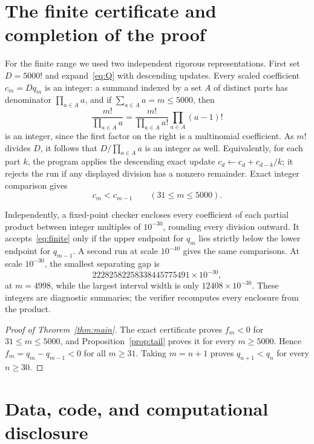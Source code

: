 \documentclass[11pt]{amsart}
\theoremstyle{remark}
\begin{document}
\section{The finite certificate and completion of the proof}

For the finite range we used two independent rigorous representations.
First set \(D=5000!\) and expand~\eqref{eq:Q} with descending updates. Every
scaled coefficient \(c_m=Dq_m\) is an integer: a summand indexed by a set
\(A\) of distinct parts has denominator \(\prod_{a\in A}a\), and
if \(\sum_{a\in A}a=m\le5000\), then
\[
 \frac{m!}{\prod_{a\in A}a}
 =\frac{m!}{\prod_{a\in A}a!}\prod_{a\in A}(a-1)!
\]
is an integer, since the first factor on the right is a multinomial
coefficient.  As \(m!\) divides \(D\), it follows that
\(D/\prod_{a\in A}a\) is an integer as well.  Equivalently, for each part
\(k\), the program applies the descending exact update
\(c_d\leftarrow c_d+c_{d-k}/k\); it rejects the run if any displayed division
has a nonzero remainder. Exact integer comparison gives
\begin{equation}\label{eq:finite}
 c_m<c_{m-1}\qquad(31\le m\le5000).
\end{equation}

Independently, a fixed-point checker encloses every coefficient of each
partial product between integer multiples of \(10^{-30}\), rounding every
division outward. It accepts~\eqref{eq:finite} only if the upper endpoint for
\(q_m\) lies strictly below the lower endpoint for \(q_{m-1}\). A second run
at scale \(10^{-40}\) gives the same comparisons. At scale \(10^{-30}\),
the smallest separating gap is
\[
 22282582258338445775491\times10^{-30},
\]
at \(m=4998\), while the largest interval width is only
\(12408\times10^{-30}\). These integers are diagnostic summaries; the
verifier recomputes every enclosure from the product.

\begin{proof}[Proof of Theorem~\ref{thm:main}]
The exact certificate proves \(f_m<0\) for \(31\le m\le5000\), and
Proposition~\ref{prop:tail} proves it for every \(m\ge5000\). Hence
\(f_m=q_m-q_{m-1}<0\) for all \(m\ge31\). Taking \(m=n+1\) proves
\(q_{n+1}<q_n\) for every \(n\ge30\).
\end{proof}

\section*{Data, code, and computational disclosure}
\end{document}
